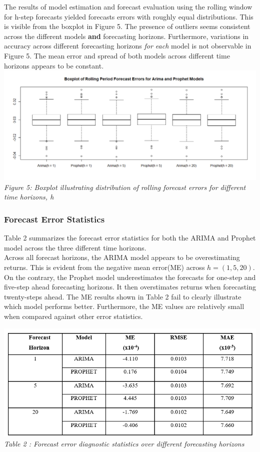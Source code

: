 \documentclass[12pt,a4paper]{article}
\numberwithin{equation}{section}
\numberwithin{figure}{section}
\numberwithin{table}{section}
\begin{document}
The results of model estimation and forecast evaluation using the
rolling window for h-step forecasts yielded forecasts errors with
roughly equal distributions. This is visible from the boxplot in Figure
5. The presence of outliers seems consistent across the different models
\textbf{and} forecasting horizons. Furthermore, variations in accuracy
across different forecasting horizons \emph{for each} model is not
observable in Figure 5. The mean error and spread of both models across
different time horizons appears to be constant.
\includegraphics[width=1.05000\textwidth]{Forecast error boxplot.png}\\
\emph{Figure 5: Boxplot illustrating distribution of rolling forecast
errors for different time horizons, h}

\subsubsection{Forecast Error
Statistics}\label{forecast-error-statistics}

Table 2 summarizes the forecast error statistics for both the ARIMA and
Prophet model across the three different time horizons.\\
Across all forecast horizons, the ARIMA model appears to be
overestimating returns. This is evident from the negative mean error(ME)
across \(h = (1,5,20)\). On the contrary, the Prophet model
underestimates the forecasts for one-step and five-step ahead
forecasting horizons. It then overstimates returns when forecasting
twenty-steps ahead. The ME results shown in Table 2 fail to clearly
illustrate which model performs better. Furthermore, the ME values are
relatively small when compared against other error statistics.

\includegraphics[width=1.00000\textwidth]{error stats.png}\\
\emph{Table 2 : Forecast error diagnostic statistics over different
forecasting horizons}
\end{document}
